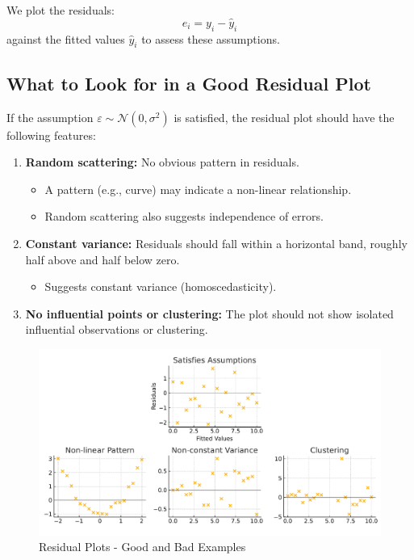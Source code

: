 \vspace{0.5em}
We plot the residuals:
\[
e_i = y_i - \hat{y}_i
\]
against the fitted values $\hat{y}_i$ to assess these assumptions.

\vspace{1em}
\subsection*{What to Look for in a Good Residual Plot}

If the assumption $\varepsilon \sim \mathcal{N}(0, \sigma^2)$ is satisfied, the residual plot should have the following features:

\begin{enumerate}
    \item \textbf{Random scattering:} No obvious pattern in residuals.
    \begin{itemize}
        \item A pattern (e.g., curve) may indicate a non-linear relationship.
        \item Random scattering also suggests independence of errors.
    \end{itemize}
    
    \item \textbf{Constant variance:} Residuals should fall within a horizontal band, roughly half above and half below zero.
    \begin{itemize}
        \item Suggests constant variance (homoscedasticity).
    \end{itemize}
    
    \item \textbf{No influential points or clustering:} The plot should not show isolated influential observations or clustering.
\end{enumerate}

\begin{figure}[H]
  \centering
  \includegraphics[width=1.0\textwidth]{section16/images/residual_plots.pdf}
  \caption{Residual Plots - Good and Bad Examples}
\end{figure}

